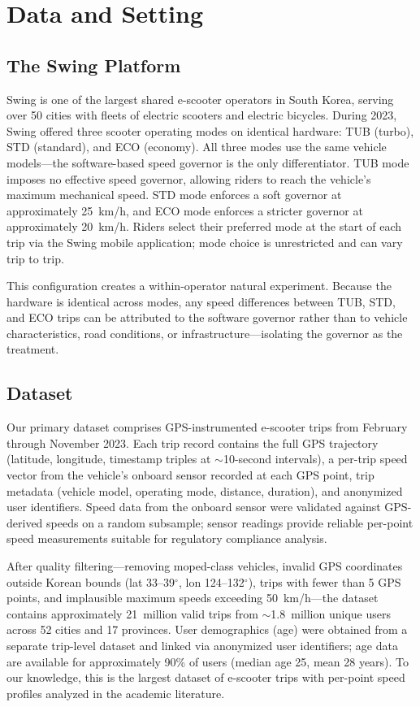 \section{Data and Setting}
\label{sec:data}

\subsection{The Swing Platform}
\label{sec:data_platform}

Swing is one of the largest shared e-scooter operators in South Korea, serving over 50 cities with fleets of electric scooters and electric bicycles. During 2023, Swing offered three scooter operating modes on identical hardware: TUB (turbo), STD (standard), and ECO (economy). All three modes use the same vehicle models---the software-based speed governor is the only differentiator. TUB mode imposes no effective speed governor, allowing riders to reach the vehicle's maximum mechanical speed. STD mode enforces a soft governor at approximately 25~km/h, and ECO mode enforces a stricter governor at approximately 20~km/h. Riders select their preferred mode at the start of each trip via the Swing mobile application; mode choice is unrestricted and can vary trip to trip.

This configuration creates a within-operator natural experiment. Because the hardware is identical across modes, any speed differences between TUB, STD, and ECO trips can be attributed to the software governor rather than to vehicle characteristics, road conditions, or infrastructure---isolating the governor as the treatment.

\subsection{Dataset}
\label{sec:data_dataset}

Our primary dataset comprises GPS-instrumented e-scooter trips from February through November 2023. Each trip record contains the full GPS trajectory (latitude, longitude, timestamp triples at $\sim$10-second intervals), a per-trip speed vector from the vehicle's onboard sensor recorded at each GPS point, trip metadata (vehicle model, operating mode, distance, duration), and anonymized user identifiers. Speed data from the onboard sensor were validated against GPS-derived speeds on a random subsample; sensor readings provide reliable per-point speed measurements suitable for regulatory compliance analysis.

After quality filtering---removing moped-class vehicles, invalid GPS coordinates outside Korean bounds (lat 33--39$^\circ$, lon 124--132$^\circ$), trips with fewer than 5 GPS points, and implausible maximum speeds exceeding 50~km/h---the dataset contains approximately 21~million valid trips from $\sim$1.8~million unique users across 52 cities and 17 provinces. User demographics (age) were obtained from a separate trip-level dataset and linked via anonymized user identifiers; age data are available for approximately 90\% of users (median age 25, mean 28 years). To our knowledge, this is the largest dataset of e-scooter trips with per-point speed profiles analyzed in the academic literature.

